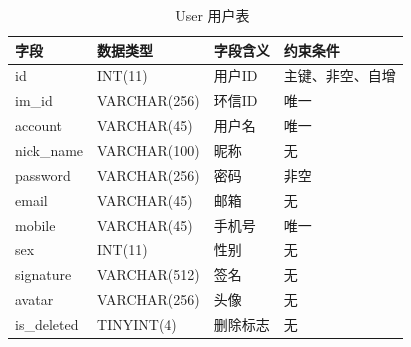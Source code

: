		\begin{table}[H]
		\centering
		\caption{\ \ User 用户表}
		\label{tab:db_table_user}
		\begin{tabular}{p{}p{}p{}p{}}
		\toprule[1.5pt]
		字段          & 数据类型         & 字段含义   & 约束条件     \\ 
		\midrule[0.75pt]
		id          & INT(11)      & 用户ID & 主键、非空、自增 \\
		im\_id      & VARCHAR(256) & 环信ID & 唯一       \\ 
		account     & VARCHAR(45)  & 用户名  & 唯一       \\ 
		nick\_name  & VARCHAR(100) & 昵称   & 无        \\
		password    & VARCHAR(256) & 密码   & 非空       \\ 
		email       & VARCHAR(45)  & 邮箱   & 无        \\
		mobile      & VARCHAR(45)  & 手机号  & 唯一        \\ 
		sex         & INT(11)      & 性别   & 无        \\ 
		signature   & VARCHAR(512) & 签名   & 无        \\
		avatar      & VARCHAR(256) & 头像   & 无        \\
		is\_deleted & TINYINT(4)   & 删除标志 & 无        \\ 
		\bottomrule[1.5pt]
		\end{tabular}
		\end{table}
		
 \clearpage